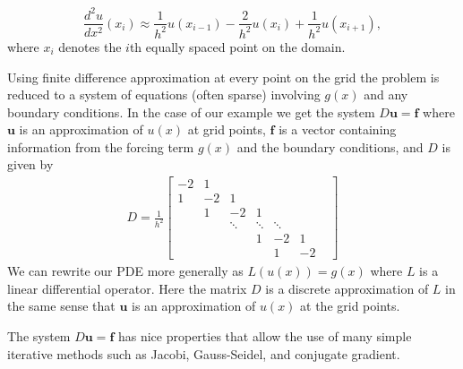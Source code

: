 \documentclass[12pt]{article}
\let\vec\mathbf
\begin{document}
$$
\frac{d^2u}{dx^2}(x_i) \approx \frac{1}{h^2}u(x_{i-1}) - \frac{2}{h^2} u(x_i) + \frac{1}{h^2} u(x_{i+1}),
$$
where $x_i$ denotes the $i$th equally spaced point on the domain.

Using finite difference approximation at every point on the grid the problem is reduced to a system of equations (often sparse) involving $g(x)$ and any boundary conditions. In the case of our example we get the system $D\vec{u} = \vec{f}$ where $\vec{u}$ is an approximation of $u(x)$ at grid points, $\vec{f}$ is a vector containing information from the forcing term $g(x)$ and the boundary conditions, and $D$ is given by
\begin{align*}
D = 
\frac{1}{h^2}\begin{bmatrix}
-2 & 1  &     &   &  &  &\\
1 & -2 &  1  &   &  &  &\\
& 1  &  -2 & 1 &  &  &\\
&    & \ddots & \ddots & \ddots&\\
&    &     & 1 & -2 & 1  \\
&    &     &   &  1 & -2
\end{bmatrix}
\end{align*}
We can rewrite our PDE more generally as $L(u(x))=g(x)$ where $L$ is a linear differential operator. Here the matrix $D$ is a discrete approximation of $L$ in the same sense that $\vec{u}$ is an approximation of $u(x)$ at the grid points.

The system $D\vec{u}=\vec{f}$ has nice properties that allow the use of many simple iterative methods such as Jacobi, Gauss-Seidel, and conjugate gradient\cite{Ascher2011}.
\end{document}
